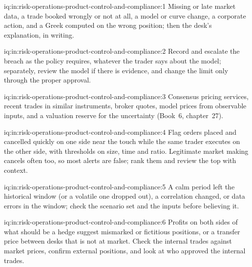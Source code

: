 \begin{solution}{iq:in:risk-operations-product-control-and-compliance:1}
Missing or late market data, a trade booked wrongly or not at all, a model or curve change, a corporate action, and a
Greek computed on the wrong position; then the desk's explanation, in writing.
\end{solution}

\begin{solution}{iq:in:risk-operations-product-control-and-compliance:2}
Record and escalate the breach as the policy requires, whatever the trader says about the model; separately, review the
model if there is evidence, and change the limit only through the proper approval.
\end{solution}

\begin{solution}{iq:in:risk-operations-product-control-and-compliance:3}
Consensus pricing services, recent trades in similar instruments, broker quotes, model prices from observable inputs,
and a valuation reserve for the uncertainty (Book~6, chapter~27).
\end{solution}

\begin{solution}{iq:in:risk-operations-product-control-and-compliance:4}
Flag orders placed and cancelled quickly on one side near the touch while the same trader executes on the other side,
with thresholds on size, time and ratio. Legitimate market making cancels often too, so most alerts are false; rank them
and review the top with context.
\end{solution}

\begin{solution}{iq:in:risk-operations-product-control-and-compliance:5}
A calm period left the historical window (or a volatile one dropped out), a correlation changed, or data errors in the
window; check the scenario set and the inputs before believing it.
\end{solution}

\begin{solution}{iq:in:risk-operations-product-control-and-compliance:6}
Profits on both sides of what should be a hedge suggest mismarked or fictitious positions, or a transfer price between
desks that is not at market. Check the internal trades against market prices, confirm external positions, and look at
who approved the internal trades.
\end{solution}
